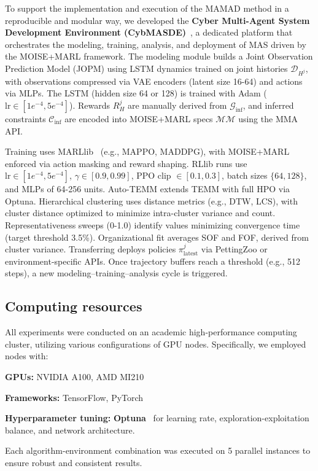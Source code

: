 \documentclass[pdflatex,sn-mathphys-num]{sn-jnl}%
\theoremstyle{thmstyleone}%
\theoremstyle{thmstyletwo}%
\theoremstyle{thmstylethree}%
\begin{document}
To support the implementation and execution of the MAMAD method in a reproducible and modular way, we developed the \textbf{Cyber Multi-Agent System Development Environment (CybMASDE)}~\footnotemark[1], a dedicated platform that orchestrates the modeling, training, analysis, and deployment of MAS driven by the MOISE+MARL framework.
%
%
The modeling module builds a Joint Observation Prediction Model (JOPM) using LSTM dynamics trained on joint histories $\mathcal{D}_{H^j}$, with observations compressed via VAE encoders (latent size 16-64) and actions via MLPs. The LSTM (hidden size 64 or 128) is trained with Adam ($\text{lr}\in[1e^{-4}, 5e^{-4}]$). Rewards $R_H^j$ are manually derived from $\mathcal{G}_{\text{inf}}$, and inferred constraints $\mathcal{C}_{\text{inf}}$ are encoded into MOISE+MARL specs $\mathcal{MM}$ using the MMA API.

Training uses MARLlib~\cite{hu2022marllib} (e.g., MAPPO, MADDPG), with MOISE+MARL enforced via action masking and reward shaping. RLlib runs use $\text{lr}\in[1e^{-4}, 5e^{-4}]$, $\gamma\in[0.9, 0.99]$, PPO clip $\in[0.1, 0.3]$, batch sizes $\{64,128\}$, and MLPs of 64-256 units.
%
Auto-TEMM extends TEMM with full HPO via Optuna. Hierarchical clustering uses distance metrics (e.g., DTW, LCS), with cluster distance optimized to minimize intra-cluster variance and count. Representativeness sweeps (0-1.0) identify values minimizing convergence time (target threshold 3.5\%). Organizational fit averages SOF and FOF, derived from cluster variance.
%
Transferring deploys policies $\pi^j_{\text{latest}}$ via PettingZoo or environment-specific APIs. Once trajectory buffers reach a threshold (e.g., 512 steps), a new modeling--training--analysis cycle is triggered.



\subsection{Computing resources}

All experiments were conducted on an academic high-performance computing cluster, utilizing various configurations of GPU nodes. Specifically, we employed nodes with:
\begin{enumerate*}[label={\roman*)}, itemjoin={; \quad}]
    \item \textbf{GPUs:} NVIDIA A100, AMD MI210
    \item \textbf{Frameworks:} TensorFlow, PyTorch
    \item \textbf{Hyperparameter tuning:} \textbf{Optuna}~\cite{akiba2019optuna} for learning rate, exploration-exploitation balance, and network architecture.
\end{enumerate*}
%
Each algorithm-environment combination was executed on 5 parallel instances to ensure robust and consistent results.
\end{document}
